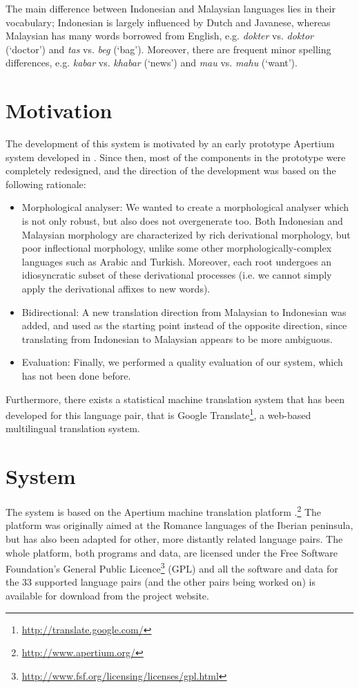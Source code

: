 \documentclass[10pt,a5paper,twoside]{article}
\begin{document}
The main difference between Indonesian and Malaysian languages lies in their vocabulary; Indonesian is largely influenced by Dutch and Javanese, whereas Malaysian has many words borrowed from English, e.g. \emph{dokter} vs. \emph{doktor} (`doctor') and \emph{tas} vs. \emph{beg} (`bag'). Moreover, there are frequent minor spelling differences, e.g. \emph{kabar} vs. \emph{khabar} (`news') and \emph{mau} vs. \emph{mahu} (`want').

\section{Motivation}
\label{sec:prev}
The development of this system is motivated by an early prototype Apertium system developed in \citep{larasati2010study}. Since then, most of the components in the prototype were completely redesigned, and the direction of the development was based on the following rationale:
\begin{itemize}
\item{Morphological analyser: We wanted to create a morphological analyser which is not only robust, but also does not overgenerate too. Both Indonesian and Malaysian morphology are characterized by rich derivational morphology, but poor inflectional morphology, unlike some other morphologically-complex languages such as Arabic and Turkish. Moreover, each root undergoes an idiosyncratic subset of these derivational processes (i.e. we cannot simply apply the derivational affixes to new words).}
\item{Bidirectional: A new translation direction from Malaysian to Indonesian was added, and used as the starting point instead of the opposite direction, since translating from Indonesian to Malaysian appears to be more ambiguous.}
\item{Evaluation: Finally, we performed a quality evaluation of our system, which has not been done before.}
\end{itemize}
Furthermore, there exists a statistical machine translation system that has been developed for this language pair, that is Google Translate\footnote{\url{http://translate.google.com/}}, a web-based multilingual translation system.

\section{System}
\label{sec:sys}
The system is based on the Apertium machine translation platform \citep{apertium/2011}.\footnote{\url{http://www.apertium.org/}} The platform was originally aimed at the Romance languages of the Iberian peninsula, but has also been adapted for other, more distantly related language pairs. The whole platform, both programs and data, are licensed under the Free Software Foundation's General Public Licence\footnote{\url{http://www.fsf.org/licensing/licenses/gpl.html}} (GPL) and all the software and data for the 33 supported language pairs (and the other pairs being worked on) is available for download from the project website.
\end{document}
